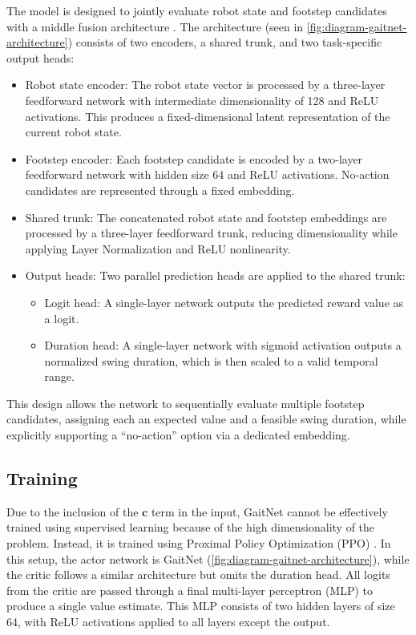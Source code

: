 The model is designed to jointly evaluate robot state and footstep
candidates with a middle fusion architecture \cite{feng2021deep}. The
architecture (seen in \autoref{fig:diagram-gaitnet-architecture})
consists of two encoders, a shared trunk, and two task-specific output heads:

\begin{itemize}
  \item Robot state encoder: The robot state vector is processed by a
    three-layer feedforward network with intermediate dimensionality
    of 128 and ReLU activations. This produces a fixed-dimensional
    latent representation of the current robot state.
  \item Footstep encoder: Each footstep candidate is encoded by a
    two-layer feedforward network with hidden size 64 and ReLU
    activations. No-action candidates are represented through a fixed embedding.
  \item Shared trunk: The concatenated robot state and footstep
    embeddings are processed by a three-layer feedforward trunk,
    reducing dimensionality while applying Layer Normalization and
    ReLU nonlinearity.
  \item Output heads: Two parallel prediction heads are applied to
    the shared trunk:
    \begin{itemize}
      \item Logit head: A single-layer network outputs the predicted
        reward value as a logit.
      \item Duration head: A single-layer network with sigmoid
        activation outputs a normalized swing duration, which is then
        scaled to a valid temporal range.
    \end{itemize}
\end{itemize}

This design allows the network to sequentially evaluate multiple
footstep candidates, assigning each an expected value and a feasible
swing duration, while explicitly supporting a “no-action” option via
a dedicated embedding.

\subsection{Training}

Due to the inclusion of the $\mathbf{c}$ term in the input, GaitNet
cannot be effectively trained using supervised learning because of
the high dimensionality of the problem. Instead, it is trained using
Proximal Policy Optimization (PPO) \cite{Schulman_proximal_2017}. In
this setup, the actor network is GaitNet
(\autoref{fig:diagram-gaitnet-architecture}), while the critic
follows a similar architecture but omits the duration head. All
logits from the critic are passed through a final multi-layer
perceptron (MLP) to produce a single value estimate. This MLP
consists of two hidden layers of size 64, with ReLU activations
applied to all layers except the output.

